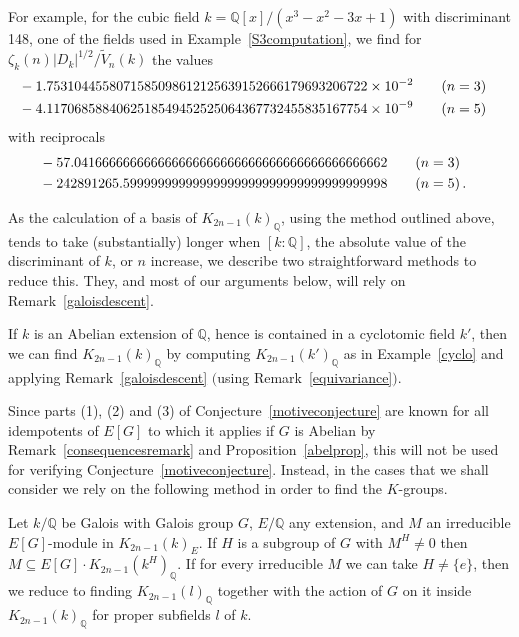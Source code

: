 \documentclass{amsart}
\begin{document}
For example, for the cubic field $ k = {\mathbb Q}[x]/(x^3 - x^2 - 3 x + 1) $ with discriminant 148, one of the fields used in Example~\ref{S3computation},
we find for $ {\zeta}_k(n) |D_k|^{1/2} / \widetilde V_n(k) $ the values
\begin{alignat*}{1}
& -1.7531044558071585098612125639152666179693206722 \times 10^{-2}      \qquad (n=3)
\cr
&  -4.1170685884062518549452525064367732455835167754 \times 10^{-9}     \qquad (n=5)
\end{alignat*}
with reciprocals
\begin{alignat*}{1}
& -57.041666666666666666666666666666666666666666662            \qquad (n=3)
\cr
& -242891265.59999999999999999999999999999999999998            \qquad (n=5)
\,.
\end{alignat*}

As the calculation of a basis of $ {K_{2n-1}(k)_{\mathbb Q}}$, using the method outlined above,
tends to take (substantially) longer when $ [k:{\mathbb Q}] $, the absolute value of the discriminant of $ k $, or 
$ n $ increase, we describe two straightforward methods to reduce this.   They, and most of our arguments
below, will rely on Remark~\ref{galoisdescent}.

\begin{method}\label{firstmethod}
If $ k $ is an Abelian extension of $ {\mathbb Q} $, hence is contained in a cyclotomic field $ k' $,
then we can find $ {K_{2n-1}(k)_{\mathbb Q}}$ by computing $ {K_{2n-1}(k')_{\mathbb Q}}$ as in Example~\ref{cyclo} and applying Remark~\ref{galoisdescent}
$($using Remark~\ref{equivariance}$)$.
\end{method}

Since parts (1), (2) and (3) of Conjecture~\ref{motiveconjecture} are known for all idempotents
of $ E[G] $ to which it applies if $ G $ is Abelian by Remark~\ref{consequencesremark}
and Proposition~\ref{abelprop}, this will not be used for
verifying Conjecture~\ref{motiveconjecture}.  Instead, in the cases that we shall consider 
we rely on the following method in order to find the $ K $-groups.

\begin{method}\label{subfields}
Let $ k/{\mathbb Q} $ be Galois with Galois group $ G $, $ E/{\mathbb Q} $ any extension, and
$ M $ an irreducible $ E[G] $-module in $ {K_{2n-1}(k)_E}$.
If $ H $ is a subgroup of $ G $ with $ M^H \ne 0 $ then 
$ M \subseteq E[G] \cdot {K_{2n-1}(k^H)_{\mathbb Q}}$.
If for every irreducible $ M $ we can take $ H \ne \{e\} $, then we reduce to
finding $ {K_{2n-1}(l)_{\mathbb Q}}$ together with the action of $ G $ on it inside $ {K_{2n-1}(k)_{\mathbb Q}}$ for proper subfields $ l $ of $ k $.
\end{method}
\end{document}
